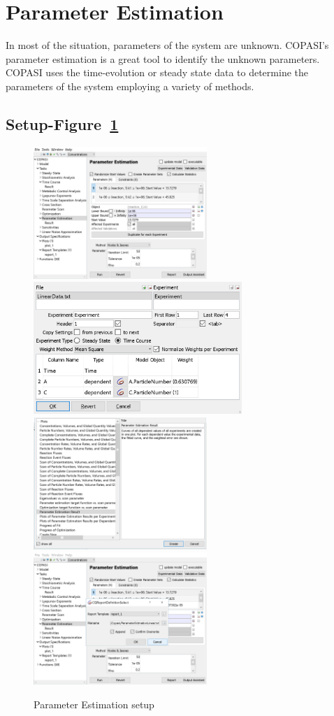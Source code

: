 \documentclass[10pt]{article}
\theoremstyle{definition}
\theoremstyle{remark}
\begin{document}
		
		\section{Parameter Estimation}
		In most of the situation, parameters of the system are unknown. COPASI's parameter estimation is a great tool to identify the unknown parameters. COPASI uses the time-evolution or steady state data to determine the parameters of the system employing a variety of methods. 
		\subsection*{Setup-Figure~\ref{10png}}
		\begin{figure}[!htb]
			\centering
			\includegraphics[height=5cm]{Images/10a.png}
			\includegraphics[height=5cm]{Images/10b.png}
			\includegraphics[height=5cm]{Images/10c.png}
			\includegraphics[height=5cm]{Images/10d.png}
			\caption{Parameter Estimation setup}
			\label{10png}
		\end{figure}
\end{document}
